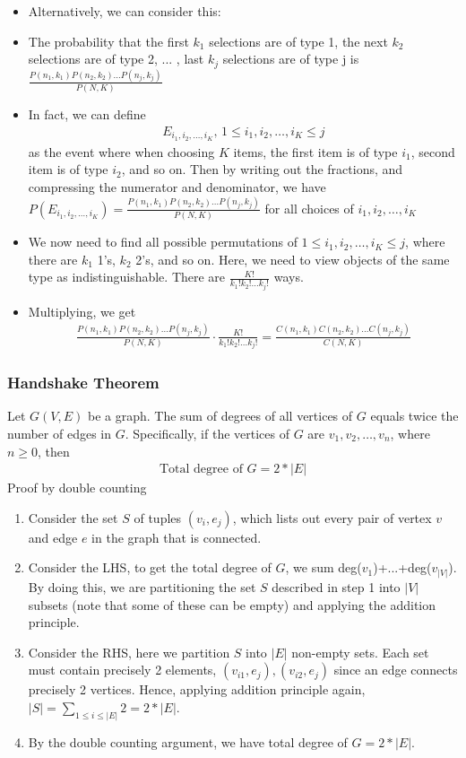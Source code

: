 \documentclass{article}
\begin{document}
\begin{enumerate}
\begin{itemize}
        \item Alternatively, we can consider this:
        \item The probability that the first $k_1$ selections are of type 1, the next $k_2$ selections are of type 2, ... , last $k_j$ selections are of type j is $\frac{P(n_1,k_1)P(n_2,k_2)\dots P(n_j,k_j)}{P(N,K)}$
        \item In fact, we can define \begin{align*}
            E_{i_1,i_2,\dots,i_K},\, 1\leq i_1,i_2,\dots,i_K\leq j
        \end{align*} as the event where when choosing $K$ items, the first item is of type $i_1$, second item is of type $i_2$, and so on. Then by writing out the fractions, and compressing the numerator and denominator, we have $P(E_{i_1,i_2,\dots,i_K})=\frac{P(n_1,k_1)P(n_2,k_2)\dots P(n_j,k_j)}{P(N,K)}$ for all choices of $i_1,i_2,\dots,i_K$
        \item We now need to find all possible permutations of $1\leq i_1,i_2,\dots,i_K\leq j$, where there are $k_1$ 1's, $k_2$ 2's, and so on. Here, we need to view objects of the same type as indistinguishable. There are $\frac{K!}{k_1!k_2!\dots k_j!}$ ways.
        \item Multiplying, we get \begin{align*}
            \frac{P(n_1,k_1)P(n_2,k_2)\dots P(n_j,k_j)}{P(N,K)}\cdot \frac{K!}{k_1!k_2!\dots k_j!}=\frac{C(n_1, k_1)  C(n_2, k_2) \dots  C(n_j, k_j)}{C(N, K)}
        \end{align*}
    \end{itemize}
\end{enumerate}

\subsubsection{Handshake Theorem}
Let $G(V,E)$ be a graph. The sum of degrees of all vertices of $G$ equals twice the number of edges in $G$. Specifically, if the vertices of $G$ are $v_1,v_2,\dots ,v_n$, where $n\geq 0$, then
\begin{align*}
    \text{Total degree of } G=2*|E|
\end{align*}
Proof by double counting
\begin{enumerate}
    \item Consider the set $S$ of tuples $(v_i,e_j)$, which lists out every pair of vertex $v$ and edge $e$ in the graph that is connected.
    \item Consider the LHS, to get the total degree of $G$, we sum deg($v_1$)+...+deg($v_{|V|}$). By doing this, we are partitioning the set $S$ described in step 1 into $|V|$ subsets (note that some of these can be empty) and applying the addition principle.
    \item Consider the RHS, here we partition $S$ into $|E|$ non-empty sets. Each set must contain precisely 2 elements, $(v_{i1},e_j),(v_{i2},e_j)$ since an edge connects precisely 2 vertices. Hence, applying addition principle again, $|S|=\sum_{1\leq i\leq |E|}2=2*|E|$.
    \item By the double counting argument, we have total degree of $G=2*|E|$.
\end{enumerate}
\end{document}
